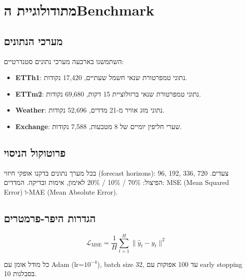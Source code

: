 
\clearpage
\chapter{מתודולוגיית ה\textenglish{Benchmark}}

\section{מערכי הנתונים}

השתמשנו בארבעה מערכי נתונים סטנדרטיים:
\begin{itemize}
\item \textbf{\textenglish{ETTh1}}: נתוני טמפרטורת שנאי חשמל שעתיים, \textenglish{17,420} נקודות.
\item \textbf{\textenglish{ETTm2}}: נתוני טמפרטורת שנאי ברזולוציית 15 דקות, \textenglish{69,680} נקודות.
\item \textbf{\textenglish{Weather}}: נתוני מזג אוויר מ-\textenglish{21} מדדים, \textenglish{52,696} נקודות.
\item \textbf{\textenglish{Exchange}}: שערי חליפין יומיים של \textenglish{8} מטבעות, \textenglish{7,588} נקודות.
\end{itemize}

\section{פרוטוקול הניסוי}

בכל מערך נתונים בדקנו אופקי חיזוי (\textenglish{forecast horizons}): \textenglish{96, 192, 336, 720} צעדים. הפיצול: \textenglish{70\% / 10\% / 20\%} לאימון, אימות ובדיקה. המדדים: \textenglish{MSE} (\textenglish{Mean Squared Error}) ו-\textenglish{MAE} (\textenglish{Mean Absolute Error}).

\section{הגדרות היפר-פרמטרים}

\begin{equation}
\mathcal{L}_{\text{MSE}} = \frac{1}{H} \sum_{t=1}^H \|\hat{y}_t - y_t\|^2
\end{equation}

כל מודל אומן עם \textenglish{Adam} (\textenglish{lr=$10^{-4}$}), \textenglish{batch size 32}, עד \textenglish{100} אפוקות עם \textenglish{early stopping} בסבלנות \textenglish{10}.
